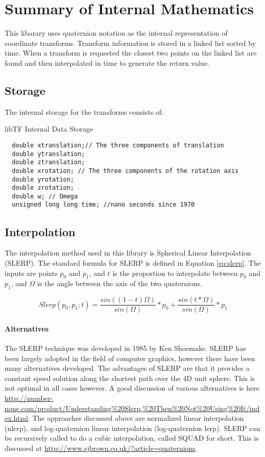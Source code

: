 \documentclass[12pt]{article}
\newcommand{\todo}[1]{\vspace{3 mm}\par \noindent {\textsc{ToDo}}\framebox{
\begin{minipage}[c]{1.0\hsize}\tt #1 \end{minipage}}\vspace{3mm}\par}
\begin{document}
\section{Summary of Internal Mathematics}
This libarary uses quaternion notation as the internal representation
of coordinate transforms.  Transform information is stored in a linked 
list sorted by time.  When a transform is requested the closest two points 
on the linked list are found and then interpolated in time to generate the 
return value.  

\subsection{Storage}
The internal storage for the transforms consists of:
\begin{struct}[H]
\caption{libTF Internal Data Storage}
\begin{verbatim}
  double xtranslation;// The three components of translation
  double ytranslation;
  double ztranslation;
  double xrotation; // The three components of the rotation axis
  double yrotation;
  double zrotation;
  double w; // Omega
  unsigned long long time; //nano seconds since 1970
\end{verbatim}
\end{struct}


\subsection{Interpolation}
The interpolation method used in this library is Spherical Linear Interpolation
(SLERP).  The standard formula for SLERP is defined in Equation \ref{eq:slerp}.
The inputs are points $p_0$ and $p_1$, and $t$ is the proportion to interpolate 
between $p_0$ and $p_1$, and $\Omega$ is the angle between the axis of the two quaternions. 

\begin{equation}
Slerp(p_0,p_1;t) = \frac{sin((1-t)\Omega)}{sin(\Omega)} * p_0 + \frac{sin(t*\Omega)}{sin(\Omega)} * p_1
\label{eq:slerp}
\end{equation}

\todo{add graphic}

\paragraph{Alternatives}
The SLERP technique was developed in 1985 by Ken Shoemake. \cite{SHOEMAKE} SLERP has been 
largely adopted in the field of computer graphics, however there have been many alternatives 
developed.  The advantages of SLERP are that it provides a constant speed solution 
along the shortest path over the 4D unit sphere.  This is not optimal in all cases however.
A good discussion of various alternatives is here \url{http://number-none.com/product/Understanding%20Slerp,%20Then%20Not%20Using%20It/index.html}. 
The approaches discussed above are normalized linear interpolation (nlerp), and 
log-quaternion linear interpolation (log-quaternion lerp). 
SLERP can be recursively called to do a cubic interpolation, called SQUAD for short.  
This is discussed at \url{http://www.sjbrown.co.uk/?article=quaternions}.






\printindex
\end{document}
